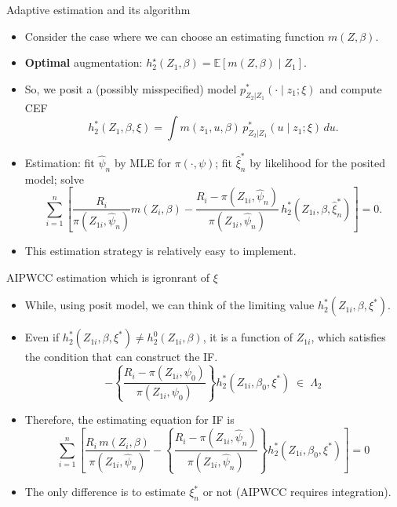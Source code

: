 \documentclass[xcolor=dvipsnames,aspectratio=169]{beamer}
\newcommand{\E}{\mathbb{E}}
\newcommand{\1}{\mathbbm{1}}
\begin{document}
\begin{frame}{Adaptive estimation and its algorithm}
  \begin{itemize}
    \item Consider the case where we can \alert{choose} an estimating function $m(Z,\beta)$.
    \item \textbf{Optimal} augmentation: $h_2^\star(Z_1,\beta)=\E\!\left[m(Z,\beta)\mid Z_1\right]$.
    \item So, we posit a (possibly misspecified) model $p^\ast_{Z_2|Z_1}(\cdot\mid z_1;\xi)$ and compute CEF
    \[
      h_2^\ast(Z_1,\beta,\xi)=\int m(z_1,u,\beta)\,p^\ast_{Z_2|Z_1}(u\mid z_1;\xi)\,du.
    \]
    \item Estimation: fit $\hat\psi_n$ by MLE for $\pi(\cdot,\psi)$; fit $\hat\xi^\ast_n$ by likelihood for the posited model; solve
    \[
      \sum_{i=1}^n\left[\frac{R_i}{\pi(Z_{1i},\hat\psi_n)}m(Z_i,\beta)
      -\frac{R_i-\pi(Z_{1i},\hat\psi_n)}{\pi(Z_{1i},\hat\psi_n)}\,h_2^\ast(Z_{1i},\beta,\hat\xi_n^\ast)\right]=0.
    \]
    \item This estimation strategy is relatively easy to implement.
  \end{itemize}
\end{frame}

\begin{frame}{AIPWCC estimation which is igronrant of $\xi$}
  \begin{itemize}
    \item While, using posit model, we can think of the limiting value $h_2^*(Z_{1i},\beta, \xi^*)$.
    \item Even if $h_2^*(Z_{1i},\beta, \xi^*)\neq h_2^0(Z_{1i},\beta)$, it is a function of $Z_{1i}$, which satisfies the condition that can construct the IF.
    \[
    -\left\{
  \frac{R_{i}-\pi(Z_{1i},\psi_{0})}{\pi(Z_{1i},\psi_{0})}
 \right\}
 h^{\ast}_{2}(Z_{1i},\beta_{0},\xi^{\ast})
 \;\in\;\Lambda_{2}
    \]
    \item Therefore, the estimating equation for IF is
    \[
    \sum_{i=1}^{n}
\left[
  \frac{R_{i}\,m(Z_{i},\beta)}{\pi(Z_{1i},\hat{\psi}_{n})}
  - \left\{
      \frac{R_{i}-\pi(Z_{1i},\hat{\psi}_{n})}{\pi(Z_{1i},\hat{\psi}_{n})}
    \right\}
    h^{\ast}_{2}(Z_{1i},\beta_{0},\xi^{\ast})
\right]
= 0
    \]
    \item The only difference is to estimate $\xi_n^*$ or not (AIPWCC requires integration).
  \end{itemize}
\end{frame}
\end{document}
